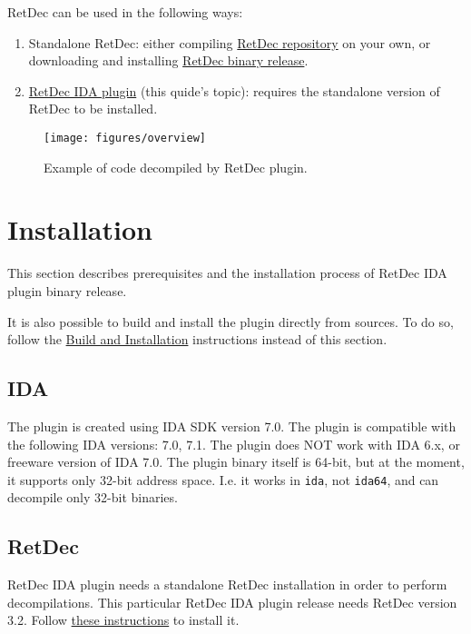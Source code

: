 \documentclass[pdftex, a4paper,12pt, oneside, svgnames]{article}
\begin{document}
RetDec can be used in the following ways:
\begin{enumerate}
	\item Standalone RetDec: either compiling \href{https://github.com/avast-tl/retdec}{RetDec repository} on your own, or downloading and installing \href{https://github.com/avast-tl/retdec/releases}{RetDec binary release}.
	\item \href{https://retdec.com/idaplugin/}{RetDec IDA plugin} (this quide's topic): requires the standalone version of RetDec to be installed.
\end{enumerate}

\begin{figure}[!ht]
	\centering
	\texttt{[image: figures/overview]}
	\caption{Example of code decompiled by RetDec plugin.}
	\label{fig:overview}
\end{figure}

\newpage
\section{Installation}
\label{sec:installation}
This section describes prerequisites and the installation process of RetDec IDA plugin binary release.

It is also possible to build and install the plugin directly from sources. To do so, follow the \href{https://github.com/avast-tl/retdec-idaplugin#build-and-installation}{Build and Installation} instructions instead of this section.

\subsection{IDA}
The plugin is created using IDA SDK version 7.0. The plugin is compatible with the following IDA versions: 7.0, 7.1. The plugin does NOT work with IDA 6.x, or freeware version of IDA 7.0. The plugin binary itself is 64-bit, but at the moment, it supports only 32-bit address space. I.e. it works in \texttt{ida}, not \texttt{ida64}, and can decompile only 32-bit binaries.

\subsection{RetDec}
\label{sec:installation:retdec}
RetDec IDA plugin needs a standalone RetDec installation in order to perform decompilations. This particular RetDec IDA plugin release needs RetDec version 3.2. Follow \href{https://github.com/avast-tl/retdec/blob/34a2640d71c96628d48864f14a32bd9cb237ed2b/README.md#installation-and-use}{these instructions} to install it.
\end{document}
